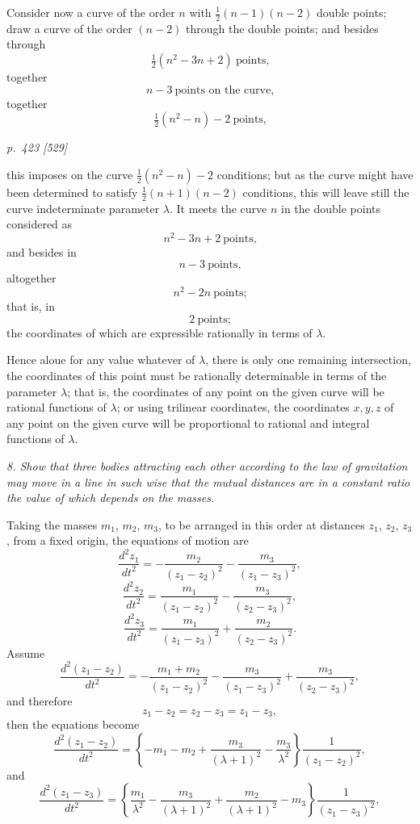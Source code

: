 \documentclass[11pt,a4paper]{article}
\theoremstyle{plain}
\theoremstyle{definition}
\begin{document}
Consider now a curve of the order $n$ with $\tfrac{1}{2}(n-1)(n-2)$ double points; draw a
curve of the order $(n-2)$ through the double points; and
besides through
\[
\tfrac{1}{2}(n^2 - 3n + 2)\ \text{points,}
\]
together
\[
n - 3\ \text{points on the curve,}
\]
together
\[
\tfrac{1}{2}(n^2 - n) - 2\ \text{points,}
\]

\clearpage

\bigskip
\textit{p.~423 [529]}
\smallskip

this imposes on the curve $\tfrac{1}{2}(n^2 - n) - 2$ conditions; but as the curve might have been
determined to satisfy $\tfrac{1}{2}(n+1)(n-2)$ conditions, this will leave still the curve indeterminate
parameter $\lambda$. It meets the curve $n$ in the double points considered as
\[
n^2 - 3n + 2\ \text{points,}
\]
and besides in
\[
n - 3\ \text{points,}
\]
altogether
\[
n^2 - 2n\ \text{points;}
\]
that is, in
\[
2\ \text{points;}
\]
the coordinates of which are expressible rationally in terms of $\lambda$.

Hence aloue for any value whatever of $\lambda$, there is only one remaining intersection, the coordinates of this point must be rationally determinable in terms of the parameter $\lambda$; that is, the coordinates of any point on the given curve will be rational functions of $\lambda$; or using trilinear coordinates, the coordinates $x, y, z$ of any point on the given curve will be proportional to rational and integral functions of $\lambda$.

\textit{8. Show that three bodies attracting each other according to the law of gravitation may move in a line in such wise that the mutual distances are in a constant ratio the value of which depends on the masses.}

Taking the masses $m_1$, $m_2$, $m_3$, to be arranged in this order at distances $z_1$, $z_2$, $z_3$,
from a fixed origin, the equations of motion are
\[
\frac{d^2 z_1}{dt^2} = -\frac{m_2}{(z_1 - z_2)^2} - \frac{m_3}{(z_1 - z_3)^2},
\]
\[
\frac{d^2 z_2}{dt^2} = \frac{m_1}{(z_1 - z_2)^2} - \frac{m_3}{(z_2 - z_3)^2},
\]
\[
\frac{d^2 z_3}{dt^2} = \frac{m_1}{(z_1 - z_3)^2} + \frac{m_2}{(z_2 - z_3)^2}.
\]
Assume
\[
\frac{d^2(z_1 - z_2)}{dt^2} = -\frac{m_1 + m_2}{(z_1 - z_2)^2} - \frac{m_3}{(z_1 - z_3)^2} + \frac{m_3}{(z_2 - z_3)^2},
\]
and therefore
\[
z_1 - z_2 = z_2 - z_3 = z_1 - z_3,
\]
then the equations become
\[
\frac{d^2(z_1 - z_2)}{dt^2} = \left\{- m_1 - m_2 + \frac{m_3}{(\lambda + 1)^2} - \frac{m_3}{\lambda^2}\right\}\frac{1}{(z_1 - z_2)^2},
\]
and
\[
\frac{d^2(z_1 - z_3)}{dt^2} = \left\{\frac{m_1}{\lambda^2} - \frac{m_3}{(\lambda + 1)^2} + \frac{m_2}{(\lambda + 1)^2} - m_3\right\}\frac{1}{(z_1 - z_3)^2},
\]
\end{document}

